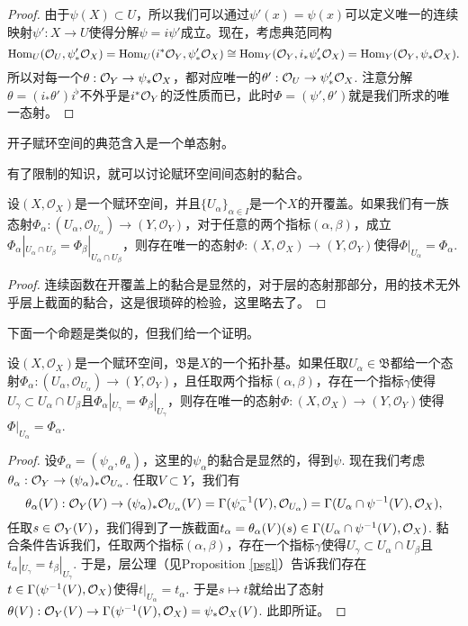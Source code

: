 \begin{proof}
由于$\psi(X)\subset U$，所以我们可以通过$\psi'(x)=\psi(x)$可以定义唯一的连续映射$\psi':X\to U$使得分解$\psi=i\psi'$成立。现在，考虑典范同构
\[
	\operatorname{Hom}_{U}(\mathcal{O}_U,\psi'_*\mathcal{O}_X)=\operatorname{Hom}_{U}(i^*\mathcal{O}_Y,\psi'_*\mathcal{O}_X)\cong \operatorname{Hom}_{Y}(\mathcal{O}_Y,i_*\psi'_*\mathcal{O}_X)=\operatorname{Hom}_{Y}(\mathcal{O}_Y,\psi_*\mathcal{O}_X).
\]
所以对每一个$\theta:\mathcal{O}_Y\to \psi_*\mathcal{O}_X$，都对应唯一的$\theta':\mathcal{O}_U\to \psi'_*\mathcal{O}_X$. 注意分解$\theta=(i_*\theta')i^\flat$不外乎是$i^*\mathcal{O}_Y$的泛性质而已，此时$\Phi=(\psi',\theta')$就是我们所求的唯一态射。
\end{proof}

\begin{coro}\label{coro:1.21}
开子赋环空间的典范含入是一个单态射。
\end{coro}

有了限制的知识，就可以讨论赋环空间间态射的黏合。

\begin{pro}
设$(X,\mathcal{O}_X)$是一个赋环空间，并且$\{U_\alpha\}_{\alpha\in I}$是一个$X$的开覆盖。如果我们有一族态射$\Phi_\alpha:(U_{\alpha},\mathcal{O}_{U_{\alpha}})\to (Y,\mathcal{O}_Y)$，对于任意的两个指标$(\alpha,\beta)$，成立$\Phi_\alpha|_{U_{\alpha}\cap U_{\beta}}=\Phi_\beta|_{U_{\alpha}\cap U_{\beta}}$，则存在唯一的态射$\Phi:(X,\mathcal{O}_{X})\to (Y,\mathcal{O}_Y)$使得$\Phi|_{U_{\alpha}}=\Phi_\alpha$.
\end{pro}

\begin{proof} 连续函数在开覆盖上的黏合是显然的，对于层的态射那部分，用的技术无外乎层上截面的黏合，这是很琐碎的检验，这里略去了。\end{proof}

下面一个命题是类似的，但我们给一个证明。

\begin{pro}\label{rsnh}
设$(X,\mathcal{O}_X)$是一个赋环空间，$\mathfrak{B}$是$X$的一个拓扑基。如果任取$U_\alpha\in \mathfrak{B}$都给一个态射$\Phi_\alpha:(U_{\alpha},\mathcal{O}_{U_{\alpha}})\to (Y,\mathcal{O}_Y)$，且任取两个指标$(\alpha,\beta)$，存在一个指标$\gamma$使得$U_\gamma\subset U_\alpha\cap U_\beta$且$\Phi_\alpha|_{U_\gamma}=\Phi_\beta|_{U_\gamma}$，则存在唯一的态射$\Phi:(X,\mathcal{O}_{X})\to (Y,\mathcal{O}_Y)$使得$\Phi|_{U_{\alpha}}=\Phi_\alpha$.
\end{pro}

\begin{proof}
设$\Phi_\alpha=(\psi_\alpha,\theta_a)$，这里的$\psi_\alpha$的黏合是显然的，得到$\psi$. 现在我们考虑$\theta_\alpha:\mathcal{O}_Y\to (\psi_\alpha)_*\mathcal{O}_{U_\alpha}$. 任取$V\subset Y$，我们有
\[
	\theta_\alpha(V):\mathcal{O}_Y(V)\to (\psi_\alpha)_*\mathcal{O}_{U_\alpha}(V)=\Gamma(\psi_\alpha^{-1}(V),\mathcal{O}_{U_\alpha})=\Gamma(U_\alpha\cap\psi^{-1}(V),\mathcal{O}_{X}),
\]
任取$s\in \mathcal{O}_Y(V)$，我们得到了一族截面$t_\alpha=\theta_\alpha(V)(s)\in\Gamma(U_\alpha\cap\psi^{-1}(V),\mathcal{O}_{X})$. 黏合条件告诉我们，任取两个指标$(\alpha,\beta)$，存在一个指标$\gamma$使得$U_\gamma\subset U_\alpha\cap U_\beta$且$t_\alpha|_{U_\gamma}=t_\beta|_{U_\gamma}$. 于是，层公理（见Proposition \ref{psgl}）告诉我们存在$t\in\Gamma(\psi^{-1}(V),\mathcal{O}_{X})$使得$t|_{U_\alpha}=t_\alpha$. 于是$s\mapsto t$就给出了态射$\theta(V):\mathcal{O}_Y(V)\to \Gamma(\psi^{-1}(V),\mathcal{O}_{X})=\psi_*\mathcal{O}_X(V)$. 此即所证。
\end{proof}

